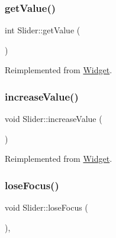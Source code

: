 \mbox{\label{class_slider_a9e72ef47f0b78846d776aa75caa4113d}} 
\subsubsection{\texorpdfstring{getValue()}{getValue()}}
{\footnotesize\ttfamily int Slider\+::get\+Value (\begin{DoxyParamCaption}{ }\end{DoxyParamCaption})\hspace{0.3cm}{\ttfamily [virtual]}}



Reimplemented from \mbox{\hyperlink{class_widget_a3b53c2690d2b33fceb73e9059458480f}{Widget}}.

\mbox{\label{class_slider_a43bb29d29c19b4f0838462a18896660c}} 
\subsubsection{\texorpdfstring{increaseValue()}{increaseValue()}}
{\footnotesize\ttfamily void Slider\+::increase\+Value (\begin{DoxyParamCaption}{ }\end{DoxyParamCaption})\hspace{0.3cm}{\ttfamily [virtual]}}



Reimplemented from \mbox{\hyperlink{class_widget_a4d4df2961aeaa579ef511a546e6276c5}{Widget}}.

\mbox{\label{class_slider_aae708de41200e777a10c9cc6d9834ce5}} 
\subsubsection{\texorpdfstring{loseFocus()}{loseFocus()}}
{\footnotesize\ttfamily void Slider\+::lose\+Focus (\begin{DoxyParamCaption}{ }\end{DoxyParamCaption})\hspace{0.3cm}{\ttfamily [override]}, {\ttfamily [virtual]}}



